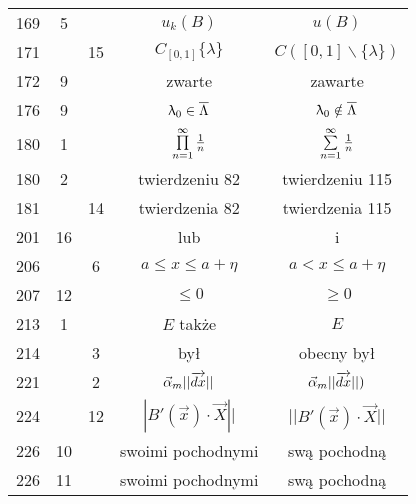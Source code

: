 \documentclass[a4paper,11pt]{article}
\newcommand{\Prod}{\prod\limits}
\newcommand{\ora}{\overrightarrow}
\newcommand{\bs}{\backslash}
\begin{document}
\begin{center}
\begin{tabular}{|c|c|c|c|c|}
    169 &  5 & & $u_{ k }( B )$ & $u( B )$ \\
    171 & & 15 & $C_{ [ 0, 1 ] } \{ \lambda \}$ & $C( [ 0, 1 ] \bs
                                                  \{ \lambda \} )$ \\
    172 &  9 & & zwarte & zawarte \\
    176 &  9 & & $\uplambda_{ 0 } \in \overline{ \Lambda }$ & $\uplambda_{ 0 }
                                              \notin \overline{ \Lambda }$ \\
    180 &  1 & & $\Prod^{ \infty }_{ n = 1 } \fr{ 1 }{ n }$
           & $\sum\limits^{ \infty }_{ n = 1 } \frac{ 1 }{ n }$ \\
    180 &  2 & & twierdzeniu 82 & twierdzeniu 115 \\
    181 & & 14 & twierdzenia 82 & twierdzenia 115 \\
    201 & 16 & & lub & i \\
    206 & &  6 & $a \leq x \leq a + \eta$ & $a < x \leq a + \eta$ \\
    207 & 12 & & $\leq 0$ & $\geq 0$ \\
    213 &  1 & & $E$ także & $E$ \\
    214 & &  3 & był & obecny był \\
    221 & &  2 & $\vec{ \al }_{ m } || \ora{ dx } ||$
           & $\vec{ \al }_{ m } || \ora{ dx } || )$ \\
    224 & & 12 & $| B'( \vec{ x } ) \cdot \vec{ X } ||$
           & $|| B'( \vec{ x } ) \cdot \vec{ X } ||$ \\
    226 & 10 & & swoimi pochodnymi & swą pochodną \\
    226 & 11 & & swoimi pochodnymi & swą pochodną \\
    \hline
  \end{tabular}


\end{center}
\end{document}
